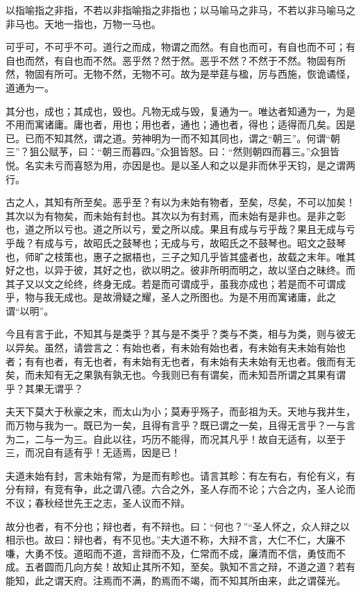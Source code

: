 \documentclass[]{article}
\begin{document}
以指喻指之非指，不若以非指喻指之非指也；以马喻马之非马，不若以非马喻马之非马也。天地一指也，万物一马也。

可乎可，不可乎不可。道行之而成，物谓之而然。有自也而可，有自也而不可；有自也而然，有自也而不然。恶乎然？然于然。恶乎不然？不然于不然。物固有所然，物固有所可。无物不然，无物不可。故为是举莛与楹，厉与西施，恢诡谲怪，道通为一。

其分也，成也；其成也，毁也。凡物无成与毁，复通为一。唯达者知通为一，为是不用而寓诸庸。庸也者，用也；用也者，通也；通也者，得也；适得而几矣。因是已。已而不知其然，谓之道。劳神明为一而不知其同也，谓之``朝三''。何谓``朝三''？狙公赋芧，曰：``朝三而暮四。''众狙皆怒。曰：``然则朝四而暮三。''众狙皆悦。名实未亏而喜怒为用，亦因是也。是以圣人和之以是非而休乎天钧，是之谓两行。

古之人，其知有所至矣。恶乎至？有以为未始有物者，至矣，尽矣，不可以加矣！其次以为有物矣，而未始有封也。其次以为有封焉，而未始有是非也。是非之彰也，道之所以亏也。道之所以亏，爱之所以成。果且有成与亏乎哉？果且无成与亏乎哉？有成与亏，故昭氏之鼓琴也；无成与亏，故昭氏之不鼓琴也。昭文之鼓琴也，师旷之枝策也，惠子之据梧也，三子之知几乎皆其盛者也，故载之末年。唯其好之也，以异于彼，其好之也，欲以明之。彼非所明而明之，故以坚白之昧终。而其子又以文之纶终，终身无成。若是而可谓成乎，虽我亦成也；若是而不可谓成乎，物与我无成也。是故滑疑之耀，圣人之所图也。为是不用而寓诸庸，此之谓``以明''。

今且有言于此，不知其与是类乎？其与是不类乎？类与不类，相与为类，则与彼无以异矣。虽然，请尝言之：有始也者，有未始有始也者，有未始有夫未始有始也者；有有也者，有无也者，有未始有无也者，有未始有夫未始有无也者。俄而有无矣，而未知有无之果孰有孰无也。今我则已有有谓矣，而未知吾所谓之其果有谓乎？其果无谓乎？

夫天下莫大于秋豪之末，而太山为小；莫寿乎殇子，而彭祖为夭。天地与我并生，而万物与我为一。既已为一矣，且得有言乎？既已谓之一矣，且得无言乎？一与言为二，二与一为三。自此以往，巧历不能得，而况其凡乎！故自无适有，以至于三，而况自有适有乎！无适焉，因是已！

夫道未始有封，言未始有常，为是而有畛也。请言其畛：有左有右，有伦有义，有分有辩，有竞有争，此之谓八德。六合之外，圣人存而不论；六合之内，圣人论而不议；春秋经世先王之志，圣人议而不辩。

故分也者，有不分也；辩也者，有不辩也。曰：``何也？''``圣人怀之，众人辩之以相示也。故曰：辩也者，有不见也。''夫大道不称，大辩不言，大仁不仁，大廉不嗛，大勇不忮。道昭而不道，言辩而不及，仁常而不成，廉清而不信，勇忮而不成。五者圆而几向方矣！故知止其所不知，至矣。孰知不言之辩，不道之道？若有能知，此之谓天府。注焉而不满，酌焉而不竭，而不知其所由来，此之谓葆光。
\end{document}
